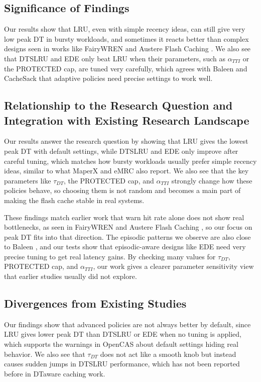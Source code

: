 \documentclass[sigconf]{acmart}
\begin{document}
\subsection{Significance of Findings}
Our results show that LRU, even with simple recency ideas, can still give very low peak DT in bursty workloads, and sometimes it reacts better than complex designs seen in works like FairyWREN \cite{mcallister2024fairywren} and Austere Flash Caching \cite{Wang2020AustereCache}. We also see that DT\text{-}SLRU and EDE only beat LRU when their parameters, such as $\alpha_{TTI}$ or the PROTECTED cap, are tuned very carefully, which agrees with Baleen \cite{wong2024baleen} and CacheSack \cite{Yang2022CacheSack} that adaptive policies need precise settings to work well.


\subsection{Relationship to the Research Question and Integration with Existing Research Landscape}
Our results answer the research question by showing that LRU gives the lowest peak DT with default settings, while DT\text{-}SLRU and EDE only improve after careful tuning, which matches how bursty workloads usually prefer simple recency ideas, similar to what MaperX \cite{liu2020maperx} and eMRC \cite{lerasle2015emrc} also report. We also see that the key parameters like $\tau_{DT}$, the PROTECTED cap, and $\alpha_{TTI}$ strongly change how these policies behave, so choosing them is not random and becomes a main part of making the flash cache stable in real systems.

These findings match earlier work that warn hit rate alone does not show real bottlenecks, as seen in FairyWREN \cite{mcallister2024fairywren} and Austere Flash Caching \cite{Wang2020AustereCache}, so our focus on peak DT fits into that direction. The episodic patterns we observe are also close to Baleen \cite{wong2024baleen}, and our tests show that episodic-aware designs like EDE need very precise tuning to get real latency gains. By checking many values for $\tau_{DT}$, PROTECTED cap, and $\alpha_{TTI}$, our work gives a clearer parameter sensitivity view that earlier studies usually did not explore.

\subsection{Divergences from Existing Studies}
Our findings show that advanced policies are not always better by default, since LRU gives lower peak DT than DT\text{-}SLRU or EDE when no tuning is applied, which supports the warnings in OpenCAS \cite{Duan2025CrashConsistency} about default settings hiding real behavior. We also see that $\tau_{DT}$ does not act like a smooth knob but instead causes sudden jumps in DT\text{-}SLRU performance, which has not been reported before in DT\text{-}aware caching work.
\end{document}
